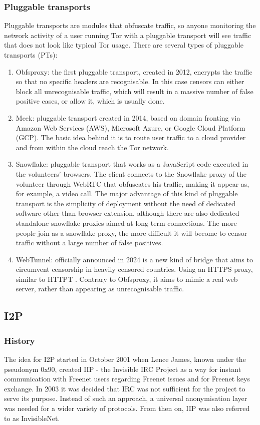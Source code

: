 \subsubsection{Pluggable transports}
Pluggable transports are modules that obfuscate traffic, so anyone monitoring the network activity of a user running Tor with a pluggable transport will see traffic that does not look like typical Tor usage. There are several types of pluggable transports (PTs):
\begin{enumerate}
    \item Obfsproxy: the first pluggable transport, created in 2012, encrypts the traffic so that no specific headers are recognisable. In this case censors can either block all unrecognisable traffic, which will result in a massive number of false positive cases, or allow it, which is usually done.
    \item Meek: pluggable transport created in 2014, based on domain fronting via Amazon Web Services (AWS), Microsoft Azure, or Google Cloud Platform (GCP). The basic idea behind it is to route user traffic to a cloud provider and from within the cloud reach the Tor network.
    \item Snowflake: pluggable transport that works as a JavaScript code executed in the volunteers' browsers. The client connects to the Snowflake proxy of the volunteer through WebRTC that obfuscates his traffic, making it appear as, for example, a video call. The major advantage of this kind of pluggable transport is the simplicity of deployment without the need of dedicated software other than browser extension, although there are also dedicated standalone snowflake proxies aimed at long-term connections. The more people join as a snowflake proxy, the more difficult it will become to censor traffic without a large number of false positives.
    \item WebTunnel: officially announced in 2024 is a new kind of bridge that aims to circumvent censorship in heavily censored countries. Using an HTTPS proxy, similar to HTTPT \cite{httpt}. Contrary to Obfsproxy, it aims to mimic a real web server, rather than appearing as unrecognisable traffic.
\end{enumerate}

\subsection{I2P}

\subsubsection{History}
The idea for I2P started in October 2001 when Lence James, known under the pseudonym 0x90, created IIP - the Invisible IRC Project as a way for instant communication with Freenet users regarding Freenet issues and for Freenet keys exchange.
In 2003 it was decided that IRC was not sufficient for the project to serve its purpose. Instead of such an approach, a universal anonymisation layer was needed for a wider variety of protocols. From then on, IIP was also referred to as InvisibleNet. 

